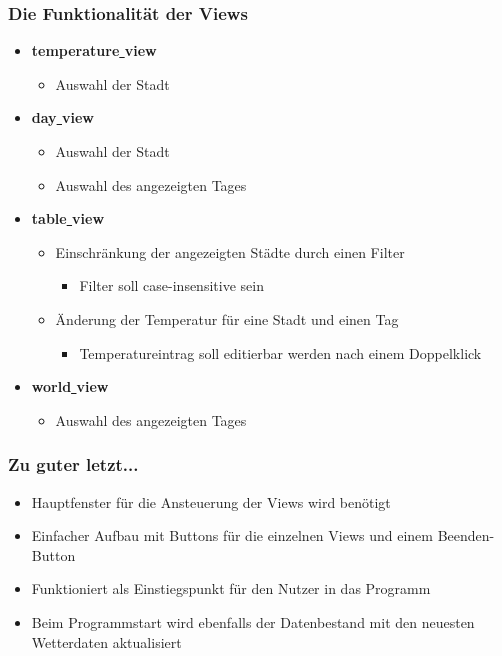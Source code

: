 \begin{frame}
  \frametitle{Die Funktionalit\"at der Views}
  \begin{itemize}
    \item \textbf{temperature\underline{ }view}
    \begin{itemize}
      \item Auswahl der Stadt
    \end{itemize}
    \item \textbf{day\underline{ }view}
    \begin{itemize}
      \item Auswahl der Stadt
      \item Auswahl des angezeigten Tages
    \end{itemize}
    \item \textbf{table\underline{ }view}
    \begin{itemize}
      \item Einschr\"ankung der angezeigten St\"adte durch einen Filter
      \begin{itemize}
        \item Filter soll case-insensitive sein
      \end{itemize}
      \item \"Anderung der Temperatur f\"ur eine Stadt und einen Tag
      \begin{itemize}
        \item Temperatureintrag soll editierbar werden nach einem Doppelklick
      \end{itemize}
    \end{itemize}
    \item \textbf{world\underline{ }view}
    \begin{itemize}
      \item Auswahl des angezeigten Tages
    \end{itemize}
  \end{itemize}
\end{frame}
\begin{frame}
  \frametitle{Zu guter letzt...}
  \begin{itemize}
    \item Hauptfenster f\"ur die Ansteuerung der Views wird ben\"otigt
    \item Einfacher Aufbau mit Buttons f\"ur die einzelnen Views und einem Beenden- Button
    \item Funktioniert als Einstiegspunkt f\"ur den Nutzer in das Programm
    \item Beim Programmstart wird ebenfalls der Datenbestand mit den neuesten Wetterdaten aktualisiert
  \end{itemize}
\end{frame}